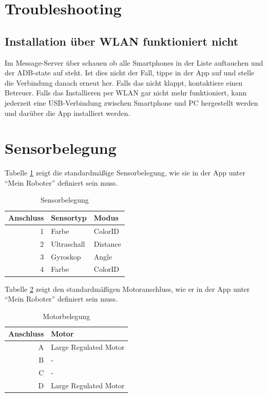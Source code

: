 		\section{Troubleshooting}
		\subsection{Installation über WLAN funktioniert nicht}
		Im Message-Server über schauen ob alle Smartphones in der Liste auftauchen und der ADB-state auf  steht. 
		Ist dies nicht der Fall, tippe in der App auf  und stelle die Verbindung danach erneut her.
		Falls das nicht klappt, kontaktiere einen Betreuer. 
		Falls das Installieren per WLAN gar nicht mehr funktioniert, kann jederzeit eine USB-Verbindung zwischen Smartphone und PC hergestellt werden und darüber die App installiert werden.
		
		
		
		\section{Sensorbelegung}
		
		Tabelle	\ref{tab:sensors} zeigt die standardmäßige Sensorbelegung, wie sie in der App unter ``Mein Roboter'' definiert sein muss.\\
			
	
		\begin{table}[h]
			\begin{center}
				\begin{tabular}{r|l|l}						
					\textbf{Anschluss} & \textbf{Sensortyp} & \textbf{Modus} \\ \hline
					1 & Farbe & ColorID \\ 
					2 & Ultraschall & Distance \\ 
					3 & Gyroskop & Angle \\ 
					4 & Farbe & ColorID \\ 
				\end{tabular}
				\caption{Sensorbelegung}
				\label{tab:sensors}
			\end{center}
		\end{table}
	
		Tabelle \ref{tab:motors} zeigt den standardmäßigen Motoranschluss, wie er in der App unter ``Mein Roboter'' definiert sein muss.\\
		
		\begin{table}[h]
			\begin{center}
				\begin{tabular}{r|l}						
					\textbf{Anschluss} & \textbf{Motor} \\ \hline
					A & Large Regulated Motor \\ 
					B & - \\ 
					C & - \\ 
					D & Large Regulated Motor \\ 
				\end{tabular}
			\end{center}
			\caption{Motorbelegung}
			\label{tab:motors}
			\end{table}
	